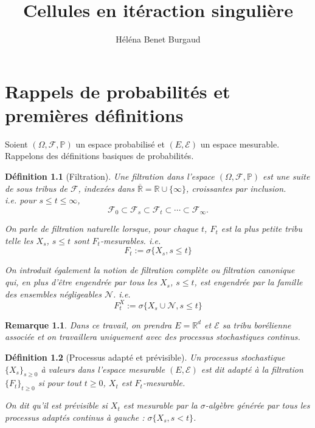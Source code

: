 \documentclass[openany]{book}
\title{Cellules en itéraction singulière}
\author{Héléna Benet Burgaud}
\newcommand{\F}{\mathscr{F}}
\newcommand{\N}{\mathscr{N}}
\newcommand{\carE}{\mathscr{E}}
\renewcommand{\P}{\mathds{P}}
\newcommand{\R}{\mathbb{R}}
\newcommand{\1}{\mathbbm{1}}
\theoremstyle{thmfont}
\theoremstyle{deffont}
\newtheorem{definition}[definition]{Définition}
\theoremstyle{thmfont}
\theoremstyle{deffont}
\newtheorem*{remark}{Remarque}
\begin{document}

\tableofcontents
\clearpage
{} %
\setcounter{page}{1}
\let\cleardoublepage\relax

\chapter{Rappels de probabilités et premières définitions}

Soient $(\Omega, \F, \P )$ un espace probabilisé et $(E, \carE)$ un espace mesurable. Rappelons des définitions basiques de probabilités.

\begin{definition}[Filtration] Une \textit{filtration} dans l'espace $(\Omega, \F, \P )$ est une suite de sous tribus de $\F$, indexées dans $\overline{\R} = \R \cup \{\infty\}$, croissantes par inclusion.\\
i.e. pour $s \leq t \leq \infty$,
$$\F_0 \subset \F_s \subset \F_t\subset \cdots \subset \F_\infty .$$

On parle de \textit{filtration naturelle} lorsque, pour chaque $t$, $F_t$ est la plus petite tribu telle les $X_s$, $s\leq t$ sont $F_t$-mesurables. i.e.
$$F_t := \sigma\{X_s, s\leq t\}$$

On introduit également la notion de \textit{filtration complète} ou
\textit{filtration canonique} qui, en plus d'être engendrée par tous les $X_s$, $s \leq t$, est engendrée par la famille des ensembles négligeables $\N$. i.e.
$$F^X_t := \sigma\{X_s\cup \N, s\leq t\}$$

\label{def:filtration}
\end{definition}

\begin{remark}
Dans ce travail, on prendra $E = \R^d$ et $\carE$ sa tribu borélienne associée et on travaillera uniquement avec des processus stochastiques continus.
\end{remark}

\begin{definition}[Processus adapté et prévisible] Un processus stochastique $\{X_s\}_{s\ge0}$ à valeurs dans l'espace mesurable $(E, \carE)$ est dit \textit{adapté} à la filtration $\{F_t\}_{t\geq0}$ si pour tout $t\geq0$, $X_t$ est $F_t$-mesurable.

  On dit qu'il est \textit{prévisible} si $X_t$ est mesurable par la $\sigma$-algèbre générée par tous les processus adaptés continus à gauche : $\sigma\{X_s, s<t\}$.
\label{def:pr_adapte}
\end{definition}
\end{document}
